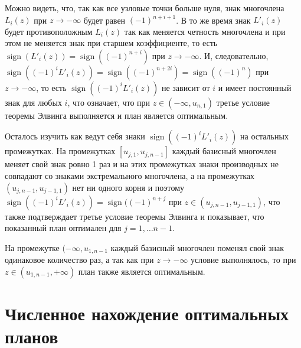 \documentclass[specialist,
               substylefile = spbu.rtx,
               subf,href,colorlinks=true, 12pt]{disser}
\theoremstyle{definition}
\DeclareMathOperator*{\sign}{sign}
\begin{document}
	Можно видеть, что, так как все узловые точки больше нуля, знак многочлена $L_i(z)$ при $z \to -\infty$ будет равен $(-1)^{n+i+1}$. В то же время знак $L'_i(z)$ будет противоположным $L_i(z)$ так как меняется четность многочлена и при этом не меняется знак при старшем коэффициенте, то есть $\sign(L'_i(z)) = \sign((-1)^{n+i})$ при $z \to -\infty$. И, следовательно, $\sign((-1)^i L'_i(z)) = \sign((-1)^{n+2i}) = \sign((-1)^{n})$ при $z \to -\infty$, то есть $\sign((-1)^i L'_i(z))$ не зависит от $i$ и имеет постоянный знак для любых $i$, что означает, что при $z \in (-\infty, u_{n, 1})$ третье условие теоремы Элвинга выполняется и план является оптимальным.
	
	Осталось изучить как ведут себя знаки $\sign((-1)^i L'_i(z))$ на остальных промежутках. На промежутках $[u_{j, 1}, u_{j, n-1}]$ каждый базисный многочлен меняет свой знак ровно 1 раз и на этих промежутках знаки производных не совпадают со знаками экстремального многочлена, а на промежутках $(u_{j, n-1}, u_{j-1, 1})$ нет ни одного корня и поэтому $\sign((-1)^i L'_i(z)) = \sign ((-1)^{n + j}$ при $z \in (u_{j, n-1}, u_{j-1, 1})$, что также подтверждает третье условие теоремы Элвинга и показывает, что показанный план оптимален для $j=1, \ldots n-1$.
	
	На промежутке $(-\infty, u_{1, n-1}$ каждый базисный многочлен поменял свой знак одинаковое количество раз, а так как при $z \to -\infty$ условие выполнялось, то при $z \in (u_{1, n-1}, +\infty)$ план также является оптимальным.
	
	
	\chapter{Численное нахождение оптимальных планов}
	 
	
	
	
	
	
	

	
	
\end{document}
